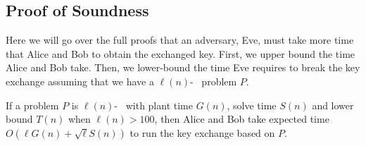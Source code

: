 \subsection{Proof of Soundness}\label{sec:proof-of-soundness}

Here we will go over the full proofs that an adversary, Eve, must take more time that Alice and Bob to obtain the exchanged key. First, we upper bound the time Alice and Bob take. Then, we lower-bound the time Eve requires to break the key exchange assuming that we have a $\ell(n)$-\keyER~ problem $P$.


\begin{lemma}
	If a problem $P$ is $\ell(n)$-\keyER~ with plant time $G(n)$, solve time $S(n)$ and lower bound $T(n)$ when $\ell(n)>100$,
	then Alice and Bob take expected time $O(\ell G(n) + \sqrt{\ell} S(n))$ to run the key exchange based on $P$.
\end{lemma}
